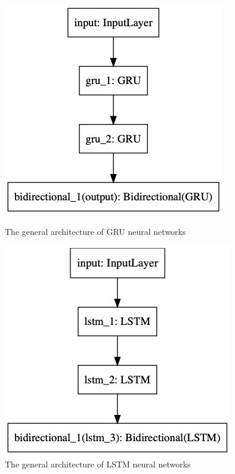 \begin{figure}[H]
\centering
\begin{minipage}{.45\textwidth}
  \centering
  \includegraphics[width=1\linewidth]{./img/gru_architecture.png}
  \caption{The general architecture of GRU neural networks}
  \label{fig:gru_architecture}
\end{minipage}%
 \vspace{1cm}
\begin{minipage}{.45\textwidth}
  \centering
  \includegraphics[width=1\linewidth]{./img/lstm_architecture.png}
  \caption{The general architecture of LSTM neural networks}
  \label{fig:lstm_architecture}
\end{minipage}
\end{figure}\label{fig:nn_architectures}

